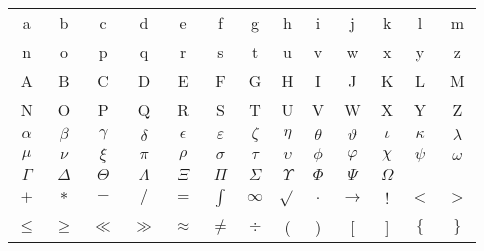 \documentclass[20pt]{extreport}
\begin{document}
\begin{center}
	\begin{tabular}{ c c c c c c c c c c c c c }
		a & b & c & d & e & f & g & h & i & j & k & l & m \\ 
		n & o & p & q & r & s & t & u & v & w & x & y & z \\  

		A & B & C & D & E & F & G & H & I & J & K & L & M \\ 

		N & O & P & Q & R & S & T & U & V & W & X & Y & Z \\ 

		\(\alpha\) & \( \beta \) & \( \gamma \) & \( \delta \) & \( \epsilon \) & \(\varepsilon \) & \( \zeta \) & \( \eta \) & \( \theta \) & \(\vartheta\) & \( \iota \) & \( \kappa \) & \( \lambda \)\\
		
		\( \mu\) & \(\nu \) & \(\xi\) & \(\pi\) & \(\rho\) & \(\sigma \) & \(\tau \) & \(\upsilon \) & \(\phi \) & \(\varphi\)& \(\chi \) & \(\psi \) & \(\omega \) \\
		
		\(\Gamma \) & \(\Delta \) & \(\Theta\) & \(\Lambda\) & \(\Xi\) & \(\Pi\) & \(\Sigma\) & \(\Upsilon\) & \(\Phi\) & \(\Psi\) & \(\Omega\) \\
		
		\(+\) & \(*\) & \(-\) & \( / \) & \(=\) & \(\int \) & \(\infty \) & \(\sqrt{} \) & \(.\) & \(\rightarrow \) & ! & \(<\) &\(>\)   \\
		
		\(\leq\) & \(\geq \) & \(\ll \) & \(\gg \) & \(\approx \) & \(\neq \) & \(\div \) & ( & ) & [ & ] & \(\{ \) & \( \} \)\\
		
	\end{tabular}
\end{center}
\end{document}
